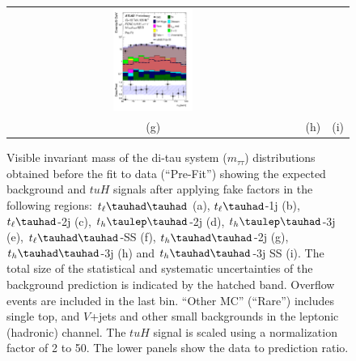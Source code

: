 \begin{figure}[H]
\begin{tabular}{@{}ccc@{}}
\includegraphics[page=1,width=0.28\textwidth]{figures/mtt/tuH_reg2mtau1b3jss_log_mtt.pdf}\\
(g) & (h) & (i)\\
\end{tabular}
\caption{Visible invariant mass of the di-tau system ($m_{\tau\tau}$) distributions obtained before the fit to data (``Pre-Fit'') showing 
  the expected background and $tuH$ signals after applying fake factors in the following regions: $t_{\ell}\thadhad$ (a),
 $t_{\ell}\tauhad$-1j (b),  $t_{\ell}\tauhad$-2j (c), $t_h\tlhad$-2j (d), $t_h\tlhad$-3j (e), $t_{\ell}\thadhad$-SS (f), $t_h\thadhad$-2j (g), $t_h\thadhad$-3j (h) and $t_h\thadhad$-3j SS (i).
 The total size of the statistical and systematic uncertainties of the background prediction is indicated by the hatched band.
 Overflow events are included in the last bin. ``Other MC'' (``Rare'') includes single top, and $V$+jets and other small backgrounds in the leptonic (hadronic) channel. The $tuH$ signal is scaled using a normalization factor of 2 to 50.   
The lower panels show the data to prediction ratio.}
\label{fig:mtt}
\end{figure}


